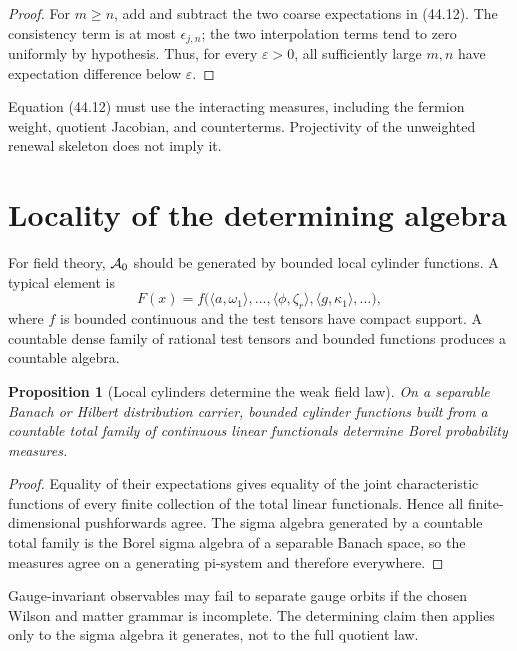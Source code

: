 \documentclass[11pt]{article}
\newtheorem{proposition}[theorem]{Proposition}
\theoremstyle{remark}
\begin{document}
\begin{proof}
For \(m\geq n\), add and subtract the two coarse expectations in
(44.12).  The consistency term is at most \(\epsilon_{j,n}\); the
two interpolation terms tend to zero uniformly by hypothesis.
Thus, for every \(\varepsilon>0\), all sufficiently large \(m,n\)
have expectation difference below \(\varepsilon\).
\end{proof}

Equation (44.12) must use the interacting measures, including the
fermion weight, quotient Jacobian, and counterterms.  Projectivity of
the unweighted renewal skeleton does not imply it.

\section{Locality of the determining algebra}

For field theory, \({\cal A}_0\) should be generated by bounded
local cylinder functions.  A typical element is
\[
 F(x)=f\bigl(
 \langle a,\omega_1\rangle,\ldots,
 \langle\phi,\zeta_r\rangle,
 \langle g,\kappa_1\rangle,\ldots\bigr),                 \tag{44.13}
\]
where \(f\) is bounded continuous and the test tensors have compact
support.  A countable dense family of rational test tensors and
bounded functions produces a countable algebra.

\begin{proposition}[Local cylinders determine the weak field law]
\label{prop:v15v44-cylinders}
On a separable Banach or Hilbert distribution carrier, bounded
cylinder functions built from a countable total family of continuous
linear functionals determine Borel probability measures.
\end{proposition}

\begin{proof}
Equality of their expectations gives equality of the joint
characteristic functions of every finite collection of the total
linear functionals.  Hence all finite-dimensional pushforwards
agree.  The sigma algebra generated by a countable total family is
the Borel sigma algebra of a separable Banach space, so the measures
agree on a generating pi-system and therefore everywhere.
\end{proof}

Gauge-invariant observables may fail to separate gauge orbits if the
chosen Wilson and matter grammar is incomplete.  The determining
claim then applies only to the sigma algebra it generates, not to
the full quotient law.
\end{document}
